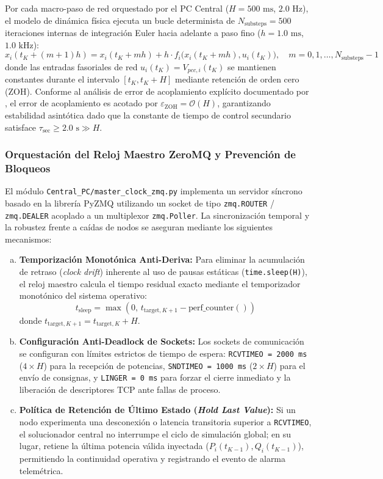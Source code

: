 Por cada macro-paso de red orquestado por el PC Central ($H = 500\text{ ms}$, $2.0\text{ Hz}$), el modelo de dinámica física ejecuta un bucle determinista de $N_{\text{substeps}} = 500$ iteraciones internas de integración Euler hacia adelante a paso fino ($h = 1.0\text{ ms}$, $1.0\text{ kHz}$):
\begin{equation}
x_i(t_K + (m+1)h) = x_i(t_K + mh) + h \cdot f_i\big(x_i(t_K + mh), u_i(t_K) \big), \quad m = 0, 1, \dots, N_{\text{substeps}}-1
\end{equation}
donde las entradas fasoriales de red $u_i(t_K) = V_{pcc, i}(t_K)$ se mantienen constantes durante el intervalo $[t_K, t_K + H]$ mediante retención de orden cero (ZOH). Conforme al análisis de error de acoplamiento explícito documentado por \citet{Kyllingstad2025CosimErrors}, el error de acoplamiento es acotado por $\varepsilon_{\text{ZOH}} = \mathcal{O}(H)$, garantizando estabilidad asintótica dado que la constante de tiempo de control secundario satisface $\tau_{\text{sec}} \ge 2.0\text{ s} \gg H$.

\subsubsection{Orquestación del Reloj Maestro ZeroMQ y Prevención de Bloqueos}
El módulo \texttt{Central\_PC/master\_clock\_zmq.py} implementa un servidor síncrono basado en la librería PyZMQ utilizando un socket de tipo \texttt{zmq.ROUTER} / \texttt{zmq.DEALER} acoplado a un multiplexor \texttt{zmq.Poller}. La sincronización temporal y la robustez frente a caídas de nodos se aseguran mediante los siguientes mecanismos:
\begin{enumerate}[a)]
    \item \textbf{Temporización Monotónica Anti-Deriva:} Para eliminar la acumulación de retraso (\textit{clock drift}) inherente al uso de pausas estáticas (\texttt{time.sleep(H)}), el reloj maestro calcula el tiempo residual exacto mediante el temporizador monotónico del sistema operativo:
    \[
    t_{\text{sleep}} = \max\left(0, \, t_{\text{target}, K+1} - \text{perf\_counter}()\right)
    \]
    donde $t_{\text{target}, K+1} = t_{\text{target}, K} + H$.
    \item \textbf{Configuración Anti-Deadlock de Sockets:} Los sockets de comunicación se configuran con límites estrictos de tiempo de espera: \texttt{RCVTIMEO = 2000 ms} ($4 \times H$) para la recepción de potencias, \texttt{SNDTIMEO = 1000 ms} ($2 \times H$) para el envío de consignas, y \texttt{LINGER = 0 ms} para forzar el cierre inmediato y la liberación de descriptores TCP ante fallas de proceso.
    \item \textbf{Política de Retención de Último Estado (\textit{Hold Last Value}):} Si un nodo experimenta una desconexión o latencia transitoria superior a \texttt{RCVTIMEO}, el solucionador central no interrumpe el ciclo de simulación global; en su lugar, retiene la última potencia válida inyectada ($P_i(t_{K-1}), Q_i(t_{K-1})$), permitiendo la continuidad operativa y registrando el evento de alarma telemétrica.
\end{enumerate}

